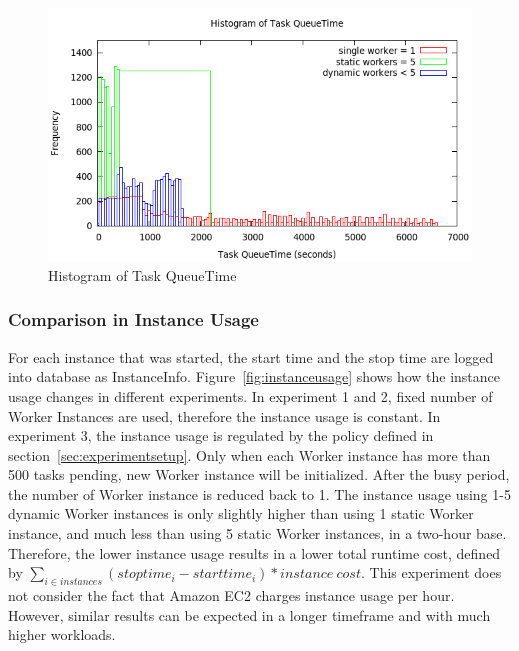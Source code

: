 \documentclass[conference]{IEEEtran}
\begin{document}
\begin{figure}[H]
\centering
        \includegraphics[totalheight=6cm,width=\linewidth]{queuetime.png}
    \caption{Histogram of Task QueueTime}
    \label{fig:queuetime}
\end{figure}

\subsubsection{Comparison in Instance Usage}\label{sec:comparisoninstance}
For each instance that was started, the start time and the stop time are logged into database as InstanceInfo. Figure~\ref{fig:instanceusage} shows how the instance usage changes in different experiments. In experiment 1 and 2, fixed number of Worker Instances are used, therefore the instance usage is constant. In experiment 3, the instance usage is regulated by the policy defined in section~\ref{sec:experimentsetup}. Only when each Worker instance has more than 500 tasks pending, new Worker instance will be initialized. After the busy period, the number of Worker instance is reduced back to 1. The instance usage using 1-5 dynamic Worker instances is only slightly higher than using 1 static Worker instance, and much less than using 5 static Worker instances, in a two-hour base.
Therefore, the lower instance usage results in a lower total runtime cost, defined by  $\sum\nolimits_{i \in instances} (stop time_{i} - start time_{i}) * instance\ cost $. This experiment does not consider the fact that Amazon EC2 charges instance usage per hour. However, similar results can be expected in a longer timeframe and with much higher workloads.
\end{document}
